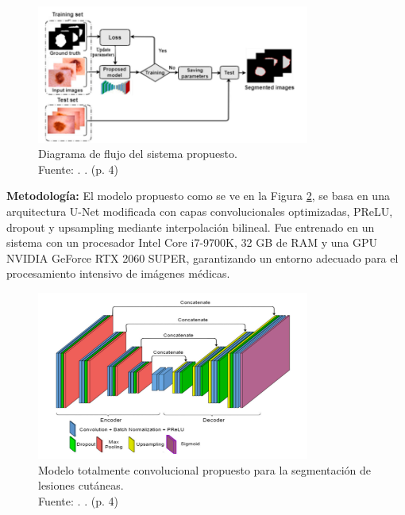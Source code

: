 \begin{figure}[!ht]
	\begin{center}
		\includegraphics[width=0.80\textwidth]{2/figures/flowchart.png}
		\caption[Diagrama de flujo del sistema propuesto]{Diagrama de flujo del sistema propuesto.\\
			Fuente: \cite{karshiev2020improved}. . (p. 4)}
		\label{2:fig6}
	\end{center}
\end{figure}

\textbf{Metodología:}
El modelo propuesto como se ve en la Figura \ref{2:fig7}, se basa en una arquitectura U-Net modificada con capas convolucionales optimizadas, PReLU, dropout y upsampling mediante interpolación bilineal. Fue entrenado en un sistema con un procesador Intel Core i7-9700K, 32 GB de RAM y una GPU NVIDIA GeForce RTX 2060 SUPER, garantizando un entorno adecuado para el procesamiento intensivo de imágenes médicas.

\begin{figure}[!ht]
	\begin{center}
		\includegraphics[width=0.80\textwidth]{2/figures/segmentation1.png}
		\caption[Modelo totalmente convolucional propuesto para la segmentación de lesiones cutáneas]{Modelo totalmente convolucional propuesto para la segmentación de lesiones cutáneas.\\
			Fuente: \cite{karshiev2020improved}. . (p. 4)}
		\label{2:fig7}
	\end{center}
\end{figure}

